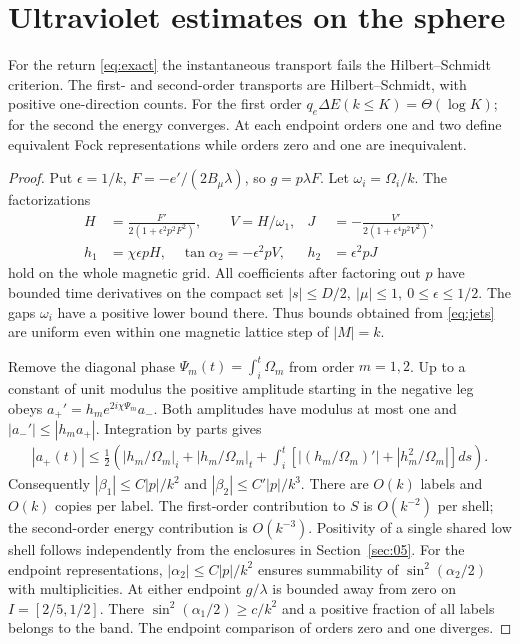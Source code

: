 \section{Ultraviolet estimates on the sphere}\label{sec:04}
\begin{theorem}
For the return \eqref{eq:exact} the instantaneous transport fails the Hilbert--Schmidt criterion. The first- and second-order transports are Hilbert--Schmidt, with positive one-direction counts. For the first order $q_e\Delta E(k\le K)=\Theta(\log K)$; for the second the energy converges. At each endpoint orders one and two define equivalent Fock representations while orders zero and one are inequivalent.
\end{theorem}
\begin{proof}
Put $\epsilon=1/k$, $F=-e'/(2B_\mu\lambda)$, so $g=p\lambda F$. Let $\omega_i=\Omega_i/k$. The factorizations
\begin{align}
 H&=\frac{F'}{2(1+\epsilon^2p^2F^2)},\qquad V=H/\omega_1,
 &J&=-\frac{V'}{2(1+\epsilon^4p^2V^2)},\nonumber\\
 h_1&=\chi\epsilon p H,\quad \tan\alpha_2=-\epsilon^2p V,
 & h_2&=\epsilon^2pJ                                             \label{eq:jets}
\end{align}
hold on the whole magnetic grid. All coefficients after factoring out $p$ have bounded time derivatives on the compact set $|s|\le D/2,\ |\mu|\le1,\ 0\le\epsilon\le1/2$. The gaps $\omega_i$ have a positive lower bound there. Thus bounds obtained from \eqref{eq:jets} are uniform even within one magnetic lattice step of $|M|=k$.

Remove the diagonal phase $\Psi_m(t)=\int_i^t\Omega_m$ from order $m=1,2$. Up to a constant of unit modulus the positive amplitude starting in the negative leg obeys $a_+'=h_m e^{2i\chi\Psi_m}a_-$. Both amplitudes have modulus at most one and $|a_-'|\le |h_m a_+|$. Integration by parts gives
\begin{align}
 |a_+(t)|\le\tfrac12\left(
 |h_m/\Omega_m|_i+|h_m/\Omega_m|_t+
 \int_i^t \left[|(h_m/\Omega_m)'|+|h_m^2/\Omega_m|\right]ds
 \right).                                                     \label{eq:ibp}
\end{align}
Consequently $|\beta_1|\le C|p|/k^2$ and $|\beta_2|\le C'|p|/k^3$. There are $O(k)$ labels and $O(k)$ copies per label. The first-order contribution to $S$ is $O(k^{-2})$ per shell; the second-order energy contribution is $O(k^{-3})$. Positivity of a single shared low shell follows independently from the enclosures in Section~\ref{sec:05}. For the endpoint representations, $|\alpha_2|\le C|p|/k^2$ ensures summability of $\sin^2(\alpha_2/2)$ with multiplicities. At either endpoint $g/\lambda$ is bounded away from zero on $I=[2/5,1/2]$. There $\sin^2(\alpha_1/2)\ge c/k^2$ and a positive fraction of all labels belongs to the band. The endpoint comparison of orders zero and one diverges.


\end{proof}
